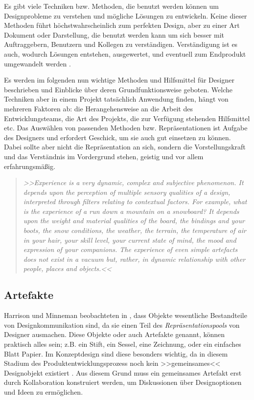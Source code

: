 \medskip Es gibt viele Techniken bzw. Methoden, die benutzt werden können um Designprobleme zu verstehen und mögliche Lösungen zu entwickeln. Keine dieser Methoden führt höchstwahrscheinlich zum perfekten Design, aber zu einer Art Dokument oder Darstellung, die benutzt werden kann um sich besser mit Auftraggebern, Benutzern und Kollegen zu verständigen. Verständigung ist es auch, wodurch Lösungen entstehen, ausgewertet, und eventuell zum Endprodukt umgewandelt werden \citep{Benyon:2005}.

\medskip Es werden im folgenden nun wichtige Methoden und Hilfsmittel für Designer beschrieben und Einblicke über deren Grundfunktionsweise geboten. Welche Techniken aber in einem Projekt tatsächlich Anwendung finden, hängt von mehreren Faktoren ab: die Herangehensweise an die Arbeit des Entwicklungsteams, die Art des Projekts, die zur Verfügung stehenden Hilfsmittel etc. Das Auswählen von passenden Methoden bzw. Repräsentationen ist Aufgabe des Designers und erfordert Geschick, um sie auch gut einsetzen zu können. Dabei sollte aber nicht die Repräsentation an sich, sondern die Vorstellungskraft und das Verständnis im Vordergrund stehen, geistig und vor allem erfahrungsmäßig. \citep{Sagmeister:2008} 

\begin{quote}
	\textsl{>>Experience is a very dynamic, complex and subjective phenomenon. It depends upon the perception of multiple sensory qualities of a design, interpreted through filters relating to contextual factors. For example, what is the experience of a run down a mountain on a snowboard? It depends upon the weight and material qualities of the board, the bindings and your boots, the snow conditions, the weather, the terrain, the temperature of air in your hair, your skill level, your current state of mind, the mood and expression of your companions. The experience of even simple artefacts does not exist in a vacuum but, rather, in dynamic relationship with other people, places and objects.<<}
\begin{flushright}\citep{Buxton:2007}\end{flushright}
\end{quote}

\subsection{Artefakte} 
Harrison und Minneman beobachteten in \citep{Harrison:1996}, dass Objekte wesentliche Bestandteile von Designkommunikation sind, da sie einen Teil des \emph{Repräsentationspools} von Designer ausmachen. Diese Objekte oder auch Artefakte genannt, können praktisch alles sein; z.B. ein Stift, ein Sessel, eine Zeichnung, oder ein einfaches Blatt Papier. Im Konzeptdesign sind diese besonders wichtig, da in diesem Stadium des Produktentwicklungsprozess noch kein >>gemeinsames<< Designobjekt existiert \citep{Tuikka:2001}. Aus diesem Grund muss ein gemeinsames Artefakt erst durch Kollaboration konstruiert werden, um Diskussionen über Designoptionen und Ideen zu ermöglichen. \citep{Larsson:2003}

